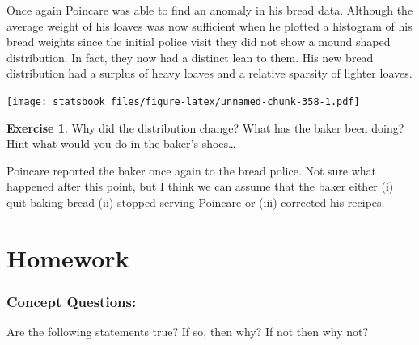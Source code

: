 \documentclass[
]{book}
\newenvironment{Shaded}{\begin{snugshade}}{\end{snugshade}}
\newcommand{\AttributeTok}[1]{\textcolor[rgb]{0.77,0.63,0.00}{#1}}
\newcommand{\FunctionTok}[1]{\textcolor[rgb]{0.00,0.00,0.00}{#1}}
\newcommand{\NormalTok}[1]{#1}
\newcommand{\SpecialCharTok}[1]{\textcolor[rgb]{0.00,0.00,0.00}{#1}}
\newcommand{\StringTok}[1]{\textcolor[rgb]{0.31,0.60,0.02}{#1}}
\theoremstyle{definition}
\theoremstyle{definition}
\theoremstyle{definition}
\newtheorem{exercise}{Exercise}[chapter]
\theoremstyle{definition}
\theoremstyle{remark}
\begin{document}
Once again Poincare was able to find an anomaly in his bread data. Although the average weight of his loaves was now sufficient when he plotted a histogram of his bread weights since the initial police visit they did not show a mound shaped distribution. In fact, they now had a distinct lean to them. His new bread distribution had a surplus of heavy loaves and a relative sparsity of lighter loaves.

\begin{Shaded}
\end{Shaded}

\texttt{[image: statsbook\_files/figure-latex/unnamed-chunk-358-1.pdf]}

\begin{exercise}
\protect\hypertarget{exr:unnamed-chunk-359}{}\label{exr:unnamed-chunk-359}Why did the distribution change? What has the baker been doing? Hint what would you do in the baker's shoes\ldots{}
\end{exercise}

Poincare reported the baker once again to the bread police. Not sure what happened after this point, but I think we can assume that the baker either (i) quit baking bread (ii) stopped serving Poincare or (iii) corrected his recipes.

\hypertarget{homework-7}{%
\section{Homework}\label{homework-7}}

\hypertarget{concept-questions-6}{%
\subsubsection{Concept Questions:}\label{concept-questions-6}}

Are the following statements true? If so, then why? If not then why not?
\end{document}
